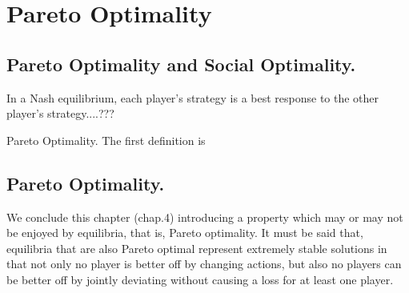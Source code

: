 \chapter{Pareto Optimality}

\section{Pareto Optimality and Social Optimality. \cite{kleinberg2010}}

In a Nash equilibrium, each player's strategy is a best response to the other player's strategy....???

Pareto Optimality. The first definition is 

\section{Pareto Optimality. \cite{bauso2014}}
We conclude this chapter (chap.4) introducing a property which may or may not be enjoyed by equilibria, that is, Pareto optimality. 
It must be said that, equilibria that are also Pareto optimal represent extremely stable solutions in that not only no player is better off by changing actions, but also no players can be better off by jointly deviating without causing a loss for at least one player.


